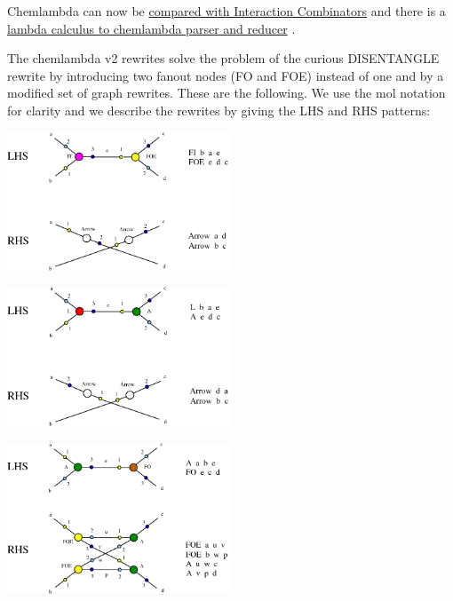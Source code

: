 \documentclass{article}
\begin{document}
Chemlambda can now be \href{https://mbuliga.github.io/quinegraphs/ice.html#howto}{compared with Interaction Combinators} \cite{buligaalife} and there is a \href{https://mbuliga.github.io/quinegraphs/lambda2mol.html#lambdanote}{lambda calculus to chemlambda parser and reducer} \cite{lambda2mol}. 


The chemlambda v2 rewrites solve the problem of the curious DISENTANGLE rewrite by introducing two fanout nodes (FO and FOE) instead of one and by a modified set of graph rewrites. These are the following. We use the mol notation for clarity and we describe the rewrites by giving the LHS and RHS patterns:



\vspace{.5cm}
 
\centerline{\includegraphics[width=0.5\textwidth]{../img/FI-FOE.jpg}
}
\vspace{.5cm}
\centerline{\includegraphics[width=0.5\textwidth]{../img/L-A.jpg}
}
\vspace{.5cm}

\vspace{.5cm}
 
\centerline{\includegraphics[width=0.5\textwidth]{../img/A-FO.jpg}
}
\vspace{.5cm}
\end{document}
